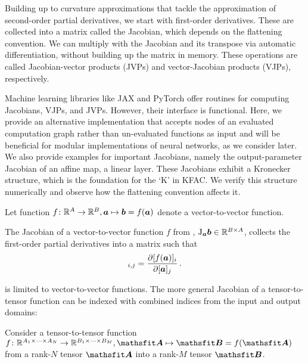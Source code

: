 Building up to curvature approximations that tackle the approximation of second-order partial derivatives, we start with first-order derivatives.
These are collected into a matrix called the Jacobian, which depends on the flattening convention.
We can multiply with the Jacobian and its transpose via automatic differentiation, without building up the matrix in memory.
These operations are called Jacobian-vector products (JVPs) and vector-Jacobian products (VJPs), respectively.

Machine learning libraries like JAX and PyTorch offer routines for computing Jacobians, VJPs, and JVPs.
However, their interface is functional.
Here, we provide an alternative implementation that accepts nodes of an evaluated computation graph rather than un-evaluated functions as input and will be beneficial for modular implementations of neural networks, as we consider later.
We also provide examples for important Jacobians, namely the output-parameter Jacobian of an affine map, \ie a linear layer.
These Jacobians exhibit a Kronecker structure, which is the foundation for the `K' in KFAC.
We verify this structure numerically and observe how the flattening convention affects it.

\begin{setup}\label{setup:vector_to_vector_function}
  Let function $f\colon {\mathbb{R}}^A \to {\mathbb{R}}^B, {\bm{a}} \mapsto {\bm{b}} = f({\bm{a}})$ denote a vector-to-vector function.
\end{setup}

\begin{definition}\label{def:vector_jacobian}
  The Jacobian of a vector-to-vector function $f$ from , $\mathrm{J}_{{\bm{a}}}{\bm{b}} \in {\mathbb{R}}^{B \times A}$, collects the first-order partial derivatives into a matrix such that
  \begin{align*}
    [\jac_{\va} \vb]_{i,j} = \frac{\partial [f(\va)]_i}{\partial [\va]_j}\,.
  \end{align*}
\end{definition}
 is limited to vector-to-vector functions.
The more general Jacobian of a tensor-to-tensor function can be indexed with combined indices from the input and output domains:

\begin{setup}\label{setup:jacobians}
  Consider a tensor-to-tensor function $f\colon \sR^{A_1 \times \dots \times A_N} \to \sR^{B_1 \times \dots \times B_M}, \tA \mapsto \tB = f(\tA)$ from a rank-$N$ tensor $\tA$ into a rank-$M$ tensor $\tB$.
\end{setup}

